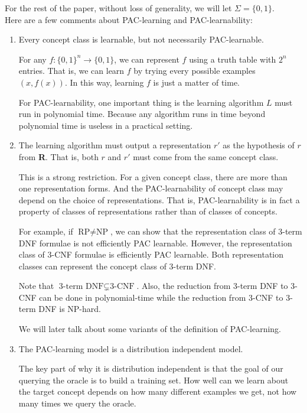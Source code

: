 \documentclass[12pt]{article}
\begin{document}
For the rest of the paper, without loss of generality, we will let $\Sigma = \{ 0, 1 \}$. \\

Here are a few comments about PAC-learning and PAC-learnability:

\begin{enumerate}
  \item Every concept class is learnable, but not necessarily PAC-learnable.

    For any $f: \{0, 1 \}^n \rightarrow \{0, 1\}$, we can represent $f$ using a truth table with $2^n$ entries. That is, we can learn $f$ by trying every possible examples $(x, f(x))$. In this way, learning $f$ is just a matter of time.

    For PAC-learnability, one important thing is the learning algorithm $L$ must run in polynomial time. Because any algorithm runs in time beyond polynomial time is useless in a practical setting.

  \item The learning algorithm must output a representation $r'$ as the hypothesis of $r$ from {\bf R}. That is, both $r$ and $r'$ must come from the same concept class.

    This is a strong restriction. For a given concept class, there are more than one representation forms. And the PAC-learnability of concept class may depend on the choice of representations. That is, PAC-learnability is in fact a property of classes of representations rather than of classes of concepts.

    For example, if $\text {RP} \neq \text {NP}$, we can show that the representation class of 3-term DNF formulae is not efficiently PAC learnable. However, the representation class of 3-CNF formulae is efficiently PAC learnable. Both representation classes can represent the concept class of 3-term DNF. 
    
    Note that $\text {3-term DNF} \subsetneq \text {3-CNF}$. Also, the reduction from 3-term DNF to 3-CNF can be done in polynomial-time while the reduction from 3-CNF to 3-term DNF is NP-hard.

    We will later talk about some variants of the definition of PAC-learning.

  \item The PAC-learning model is a distribution independent model.
    
    The key part of why it is distribution independent is that the goal of our querying the oracle is to build a training set. How well can we learn about the target concept depends on how many different examples we get, not how many times we query the oracle.


\end{enumerate}
\end{document}
